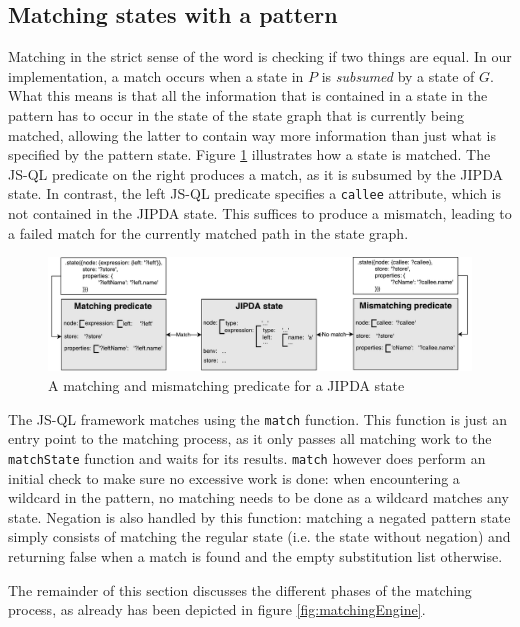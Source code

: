 \subsection{Matching states with a pattern}
\label{subsec:matching}

Matching in the strict sense of the word is checking if two things are equal. In our implementation, a match occurs when a state in $P$ is \textit{subsumed} by a state of $G$. What this means is that all the information that is contained in a state in the pattern has to occur in the state of the state graph that is currently being matched, allowing the latter to contain way more information than just what is specified by the pattern state. Figure \ref{fig:matchingPredicates} illustrates how a state is matched. The JS-QL predicate on the right produces a match, as it is subsumed by the JIPDA state. In contrast, the left JS-QL predicate specifies a \texttt{callee} attribute, which is not contained in the JIPDA state. This suffices to produce a mismatch, leading to a failed match for the currently matched path in the state graph.
\begin{figure}[!h]
    \centering
      \includegraphics[width=1\textwidth]{images/matchingPredicates} 
      \caption{A matching and mismatching predicate for a JIPDA state}
    \label{fig:matchingPredicates}
\end{figure}

The JS-QL framework matches using the \texttt{match} function. This function is just an entry point to the matching process, as it only passes all matching work to the \texttt{matchState} function and waits for its results. \texttt{match} however does perform an initial check to make sure no excessive work is done: when encountering a wildcard in the pattern, no matching needs to be done as a wildcard matches any state. Negation is also handled by this function: matching a negated pattern state simply consists of matching the regular state (i.e. the state without negation) and returning false when a match is found and the empty substitution list otherwise. 

The remainder of this section discusses the different phases of the matching process, as already has been depicted in figure \ref{fig:matchingEngine}.



